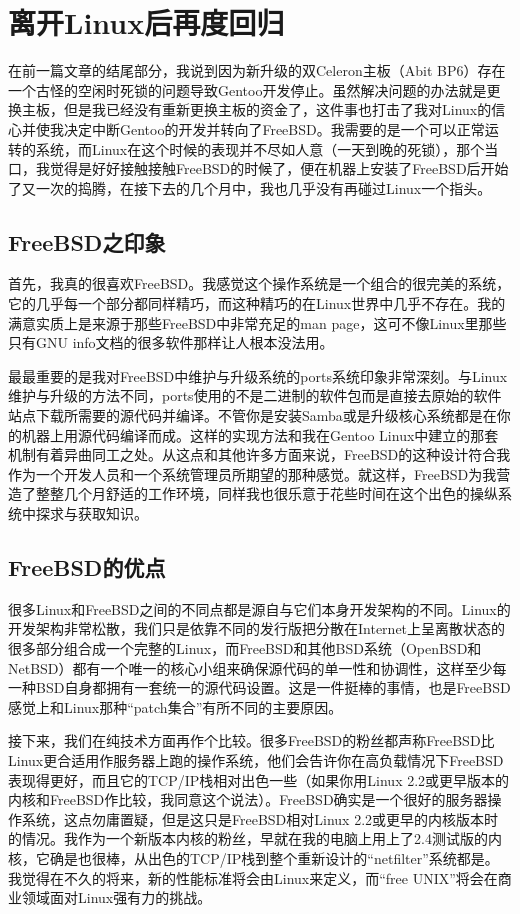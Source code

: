\section{离开Linux后再度回归}

在前一篇文章的结尾部分，我说到因为新升级的双Celeron主板（Abit BP6）存在一个古怪的空闲时死锁的问题导致Gentoo开发停止。虽然解决问题的办法就是更换主板，但是我已经没有重新更换主板的资金了，这件事也打击了我对Linux的信心并使我决定中断Gentoo的开发并转向了FreeBSD。我需要的是一个可以正常运转的系统，而Linux在这个时候的表现并不尽如人意（一天到晚的死锁），那个当口，我觉得是好好接触接触FreeBSD的时候了，便在机器上安装了FreeBSD后开始了又一次的捣腾，在接下去的几个月中，我也几乎没有再碰过Linux一个指头。

\subsection{FreeBSD之印象}

首先，我真的很喜欢FreeBSD。我感觉这个操作系统是一个组合的很完美的系统，它的几乎每一个部分都同样精巧，而这种精巧的在Linux世界中几乎不存在。我的满意实质上是来源于那些FreeBSD中非常充足的man page，这可不像Linux里那些只有GNU info文档的很多软件那样让人根本没法用。

最最重要的是我对FreeBSD中维护与升级系统的ports系统印象非常深刻。与Linux维护与升级的方法不同，ports使用的不是二进制的软件包而是直接去原始的软件站点下载所需要的源代码并编译。不管你是安装Samba或是升级核心系统都是在你的机器上用源代码编译而成。这样的实现方法和我在Gentoo Linux中建立的那套机制有着异曲同工之处。从这点和其他许多方面来说，FreeBSD的这种设计符合我作为一个开发人员和一个系统管理员所期望的那种感觉。就这样，FreeBSD为我营造了整整几个月舒适的工作环境，同样我也很乐意于花些时间在这个出色的操纵系统中探求与获取知识。

\subsection{FreeBSD的优点}

很多Linux和FreeBSD之间的不同点都是源自与它们本身开发架构的不同。Linux的开发架构非常松散，我们只是依靠不同的发行版把分散在Internet上呈离散状态的很多部分组合成一个完整的Linux，而FreeBSD和其他BSD系统（OpenBSD和NetBSD）都有一个唯一的核心小组来确保源代码的单一性和协调性，这样至少每一种BSD自身都拥有一套统一的源代码设置。这是一件挺棒的事情，也是FreeBSD感觉上和Linux那种“patch集合”有所不同的主要原因。

接下来，我们在纯技术方面再作个比较。很多FreeBSD的粉丝都声称FreeBSD比Linux更合适用作服务器上跑的操作系统，他们会告许你在高负载情况下FreeBSD表现得更好，而且它的TCP/IP栈相对出色一些（如果你用Linux 2.2或更早版本的内核和FreeBSD作比较，我同意这个说法）。FreeBSD确实是一个很好的服务器操作系统，这点勿庸置疑，但是这只是FreeBSD相对Linux 2.2或更早的内核版本时的情况。我作为一个新版本内核的粉丝，早就在我的电脑上用上了2.4测试版的内核，它确是也很棒，从出色的TCP/IP栈到整个重新设计的“netfilter”系统都是。我觉得在不久的将来，新的性能标准将会由Linux来定义，而“free UNIX”将会在商业领域面对Linux强有力的挑战。

